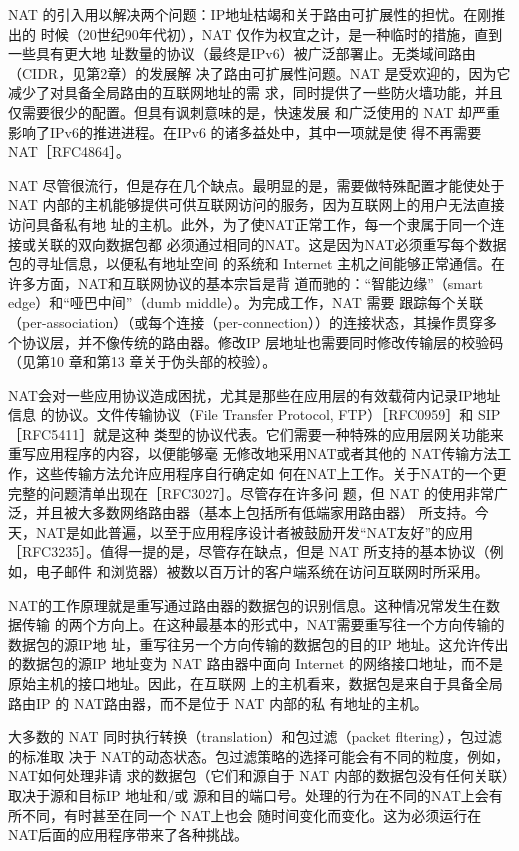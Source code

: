 NAT 的引入用以解决两个问题：IP地址枯竭和关于路由可扩展性的担忧。在刚推出的
时候（20世纪90年代初），NAT 仅作为权宜之计，是一种临时的措施，直到一些具有更大地
址数量的协议（最终是IPv6）被广泛部署止。无类域间路由（CIDR，见第2章）的发展解
决了路由可扩展性问题。NAT 是受欢迎的，因为它减少了对具备全局路由的互联网地址的需
求，同时提供了一些防火墙功能，并且仅需要很少的配置。但具有讽刺意味的是，快速发展
和广泛使用的 NAT 却严重影响了IPv6的推进进程。在IPv6 的诸多益处中，其中一项就是使
得不再需要 NAT［RFC4864］。

NAT 尽管很流行，但是存在几个缺点。最明显的是，需要做特殊配置才能使处于 NAT
内部的主机能够提供可供互联网访问的服务，因为互联网上的用户无法直接访问具备私有地
址的主机。此外，为了使NAT正常工作，每一个隶属于同一个连接或关联的双向数据包都
必须通过相同的NAT。这是因为NAT必须重写每个数据包的寻址信息，以便私有地址空间
的系统和 Internet 主机之间能够正常通信。在许多方面，NAT和互联网协议的基本宗旨是背
道而驰的：“智能边缘”（smart edge）和“哑巴中间”（dumb middle）。为完成工作，NAT 需要
跟踪每个关联（per-association）（或每个连接（per-connection））的连接状态，其操作贯穿多
个协议层，并不像传统的路由器。修改IP 层地址也需要同时修改传输层的校验码（见第10
章和第13 章关于伪头部的校验）。

NAT会对一些应用协议造成困扰，尤其是那些在应用层的有效载荷内记录IP地址信息
的协议。文件传输协议（File Transfer Protocol, FTP）［RFC0959］和 SIP［RFC5411］就是这种
类型的协议代表。它们需要一种特殊的应用层网关功能来重写应用程序的内容，以便能够毫
无修改地采用NAT或者其他的 NAT传输方法工作，这些传输方法允许应用程序自行确定如
何在NAT上工作。关于NAT的一个更完整的问题清单出现在［RFC3027］。尽管存在许多问
题，但 NAT 的使用非常广泛，并且被大多数网络路由器（基本上包括所有低端家用路由器）
所支持。今天，NAT是如此普遍，以至于应用程序设计者被鼓励开发“NAT友好”的应用
［RFC3235］。值得一提的是，尽管存在缺点，但是 NAT 所支持的基本协议（例如，电子邮件
和浏览器）被数以百万计的客户端系统在访问互联网时所采用。

NAT的工作原理就是重写通过路由器的数据包的识别信息。这种情况常发生在数据传输
的两个方向上。在这种最基本的形式中，NAT需要重写往一个方向传输的数据包的源IP地
址，重写往另一个方向传输的数据包的目的IP 地址。这允许传出的数据包的源IP 地址变为
NAT 路由器中面向 Internet 的网络接口地址，而不是原始主机的接口地址。因此，在互联网
上的主机看来，数据包是来自于具备全局路由IP 的 NAT路由器，而不是位于 NAT 内部的私
有地址的主机。

大多数的 NAT 同时执行转换（translation）和包过滤（packet fltering），包过滤的标准取
决于 NAT的动态状态。包过滤策略的选择可能会有不同的粒度，例如，NAT如何处理非请
求的数据包（它们和源自于 NAT 内部的数据包没有任何关联）取决于源和目标IP 地址和/或
源和目的端口号。处理的行为在不同的NAT上会有所不同，有时甚至在同一个 NAT上也会
随时间变化而变化。这为必须运行在 NAT后面的应用程序带来了各种挑战。

